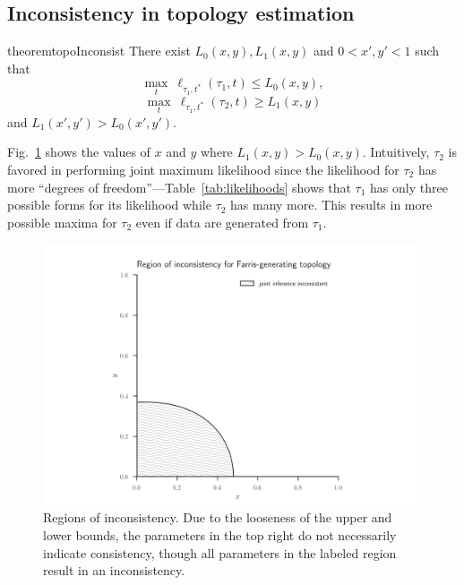 \documentclass{article}
\begin{document}
\subsection*{Inconsistency in topology estimation}

\begin{restatable}{theorem}{topoInconsist}
There exist $L_0(x, y), L_1(x, y)$ and $0 < x', y' < 1$ such that
$$
\max_{t} \ \ell_{\tau_1,t^*}(\tau_1, t) \le L_0(x, y),
$$
$$
\max_{t} \ \ell_{\tau_1,t^*}(\tau_2, t) \ge L_1(x, y)
$$
and $L_1(x', y') > L_0(x', y')$.
\end{restatable}
Fig.~\ref{fig:inconsistency-farris} shows the values of $x$ and $y$ where $L_1(x, y) > L_0(x, y)$.
Intuitively, $\tau_2$ is favored in performing joint maximum likelihood since the likelihood for $\tau_2$ has more ``degrees of freedom''---Table~\ref{tab:likelihoods} shows that $\tau_1$ has only three possible forms for its likelihood while $\tau_2$ has many more.
This results in more possible maxima for $\tau_2$ even if data are generated from $\tau_1$.

\begin{figure}
\centering
\includegraphics[width=.9\textwidth]{topology-inconsistency-inkscape}
\caption{
    Regions of inconsistency.
    Due to the looseness of the upper and lower bounds, the parameters in the top right do not necessarily indicate consistency, though all parameters in the labeled region result in an inconsistency.
}
\label{fig:inconsistency-farris}
\end{figure}
\end{document}
